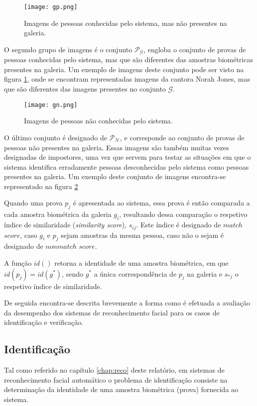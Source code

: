 \begin{figure}[ht]
  \begin{center}
    \leavevmode
    \texttt{[image: gp.png]}
    \caption{Imagens de pessoas conhecidas pelo sistema, mas não presentes na galeria.}	
    \label{fig:gp}
  \end{center}
\end{figure}
O segundo grupo de imagens é o conjunto $\mathscr{P}_\mathscr{G}$, engloba o conjunto de provas de pessoas conhecidas pelo sistema, mas que são diferentes das amostras biométricas presentes na galeria. Um exemplo de imagens deste conjunto pode ser visto na figura \ref{fig:gp}, onde se encontram representadas imagens da cantora Norah Jones, mas que são diferentes das imagens presentes no conjunto $\mathscr{G}$.

\begin{figure}[ht]
  \begin{center}
    \leavevmode
    \texttt{[image: gn.png]}
    \caption{Imagens de pessoas não conhecidas pelo sistema.}	
    \label{fig:gn}
  \end{center}
\end{figure}
O último conjunto é designado de $\mathscr{P}_\mathscr{N}$, e corresponde ao conjunto de provas de pessoas não presentes na galeria. Essas imagens são também muitas vezes designadas de impostores, uma vez que servem para testar as situações em que o sistema identifica erradamente pessoas desconhecidas pelo sistema como pessoas presentes na galeria. Um exemplo deste conjunto de imagens encontra-se representado na figura \ref{fig:gn}

Quando uma prova $p_j$ é apresentada ao sistema, essa prova é então comparada a cada amostra biométrica da galeria $g_i$, resultando dessa comparação o respetivo índice de similaridade (\textit{similarity score}), $s_{ij}$. Este índice é designado de $match$ $score$, caso $g_i$ e $p_j$ sejam amostras da mesma pessoa, caso não o sejam é designado de $nonmatch$ $score$.

A função $id()$ retorna a identidade de uma amostra biométrica, em que $id(p_j) = id(g^*)$, sendo $g^*$ a única correspondência de $p_j$ na galeria e $s_{*j}$ o respetivo índice de similaridade.

De seguida encontra-se descrita brevemente a forma como é efetuada a avaliação da desempenho dos sistemas de reconhecimento facial para os casos de identificação e verificação.

\subsection{Identificação}
Tal como referido no capítulo \ref{chap:reco} deste relatório, em sistemas de reconhecimento facial automático o problema de identificação consiste na determinação da identidade de uma amostra biométrica (prova) fornecida ao sistema.

